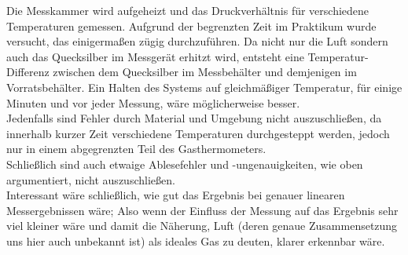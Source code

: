 \documentclass[12pt,a4paper]{article}
\begin{document}
\begin{multicols}{2}
Die Messkammer wird aufgeheizt und das Druckverhältnis für verschiedene Temperaturen gemessen. Aufgrund der begrenzten Zeit im Praktikum wurde versucht, das einigermaßen zügig durchzuführen. Da nicht nur die Luft sondern auch das Quecksilber im Messgerät erhitzt wird, entsteht eine Temperatur-Differenz zwischen dem Quecksilber im Messbehälter und demjenigen im Vorratsbehälter. Ein Halten des Systems auf gleichmäßiger Temperatur, für einige Minuten und vor jeder Messung, wäre möglicherweise besser.\\
Jedenfalls sind Fehler durch Material und Umgebung nicht auszuschließen, da innerhalb kurzer Zeit verschiedene Temperaturen durchgesteppt werden, jedoch nur in einem abgegrenzten Teil des Gasthermometers.\\
Schließlich sind auch etwaige Ablesefehler und -ungenauigkeiten, wie oben argumentiert, nicht auszuschließen.\\
Interessant wäre schließlich, wie gut das Ergebnis bei genauer linearen Messergebnissen wäre; Also wenn der Einfluss der Messung auf das Ergebnis sehr viel kleiner wäre und damit die Näherung, Luft (deren genaue Zusammensetzung uns hier auch unbekannt ist) als ideales Gas zu deuten, klarer erkennbar wäre.



\end{multicols}
\end{document}
